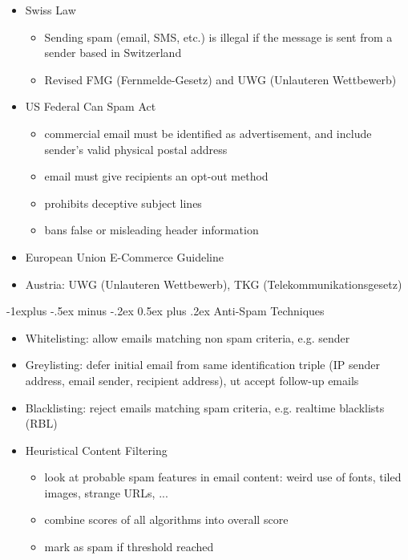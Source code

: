 \documentclass[a4paper,twocolumn]{article}
\makeatletter
\newenvironment{itemization}[1][\small]{%
    \begin{itemize}[leftmargin=*]
            #1
        }{%
    \end{itemize}
}
\renewcommand{\subsection}{%
    \@startsection{subsection}{2}{0mm}%
    {-1explus -.5ex minus -.2ex}%
    {0.5ex plus .2ex}%
    {\normalfont\small\bfseries}
}
\makeatother
\begin{document}
\begin{footnotesize}
\begin{itemization}
\item Swiss Law
\begin{itemization}
\item Sending spam (email, SMS, etc.) is illegal if the message is sent from a sender based in Switzerland
\item Revised FMG (Fernmelde-Gesetz) and UWG (Unlauteren Wettbewerb)
\end{itemization}

\item US Federal Can Spam Act
\begin{itemization}
\item commercial email must be identified as advertisement, and include sender's valid physical postal address
\item email must give recipients an opt-out method
\item prohibits deceptive subject lines
\item bans false or misleading header information
\end{itemization}

\item European Union E-Commerce Guideline
\item Austria: UWG (Unlauteren Wettbewerb), TKG (Telekommunikationsgesetz)
\end{itemization}

\subsection{Anti-Spam Techniques}
\begin{itemization}
\item Whitelisting: allow emails matching non spam criteria, e.g. sender
\item Greylisting: defer initial email from same identification triple (IP sender address, email sender, recipient address), ut accept follow-up emails
\item Blacklisting: reject emails matching spam criteria, e.g. realtime blacklists (RBL)

\item Heuristical Content Filtering
\begin{itemization}
\item look at probable spam features in email content: weird use of fonts, tiled images, strange URLs, ...
\item combine scores of all algorithms into overall score
\item mark as spam if threshold reached
\end{itemization}


\end{itemization}
\end{footnotesize}
\end{document}
